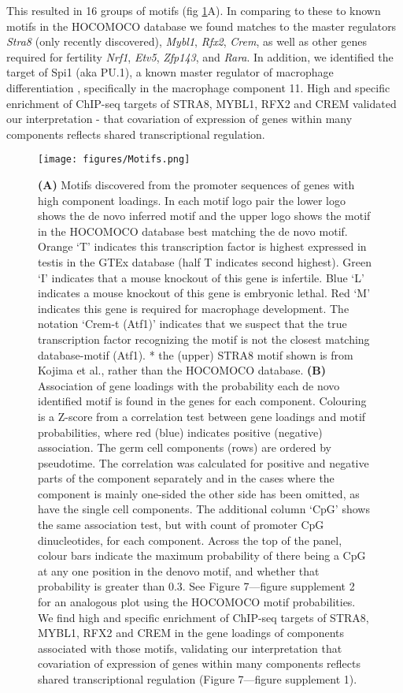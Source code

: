 This resulted in 16 groups of motifs (fig \ref{fig:Motifs}A). In comparing to these to known motifs in the HOCOMOCO database we found matches to the master regulators \textit{Stra8} (only recently discovered), \textit{Mybl1}, \textit{Rfx2}, \textit{Crem}, as well as other genes required for fertility \textit{Nrf1}, \textit{Etv5}, \textit{Zfp143}, and \textit{Rara}. In addition, we identified the target of Spi1 (aka PU.1), a known master regulator of macrophage differentiation \parencite{Rosa2007interplay}, specifically in the macrophage component 11. High and specific enrichment of ChIP-seq targets of STRA8, MYBL1, RFX2 and CREM validated our interpretation - that covariation of expression of genes within many components reflects shared transcriptional regulation.

\begin{figure}[H]
	\centering
	\texttt{[image: figures/Motifs.png]}
	\caption{
		\textbf{(A)} Motifs discovered from the promoter sequences of genes with high component loadings. In each motif logo pair the lower logo shows the de novo inferred motif and the upper logo shows the motif in the HOCOMOCO database best matching the de novo motif. Orange ‘T’ indicates this transcription factor is highest expressed in testis in the GTEx database (half T indicates second highest). Green ‘I’ indicates that a mouse knockout of this gene is infertile. Blue ‘L’ indicates a mouse knockout of this gene is embryonic lethal. Red ‘M’ indicates this gene is required for macrophage development. The notation ‘Crem-t (Atf1)’ indicates that we suspect that the true transcription factor recognizing the motif is not the closest matching database-motif (Atf1). * the (upper) STRA8 motif shown is from Kojima et al., rather than the HOCOMOCO database.
		\textbf{(B)} Association of gene loadings with the probability each de novo identified motif is found in the genes for each component. Colouring is a Z-score from a correlation test between gene loadings and motif probabilities, where red (blue) indicates positive (negative) association. The germ cell components (rows) are ordered by pseudotime. The correlation was calculated for positive and negative parts of the component separately and in the cases where the component is mainly one-sided the other side has been omitted, as have the single cell components. The additional column ‘CpG’ shows the same association test, but with count of promoter CpG dinucleotides, for each component. Across the top of the panel, colour bars indicate the maximum probability of there being a CpG at any one position in the denovo motif, and whether that probability is greater than 0.3. See Figure 7—figure supplement 2 for an analogous plot using the HOCOMOCO motif probabilities. We find high and specific enrichment of ChIP-seq targets of STRA8, MYBL1, RFX2 and CREM in the gene loadings of components associated with those motifs, validating our interpretation that covariation of expression of genes within many components reflects shared transcriptional regulation (Figure 7—figure supplement 1).
	}
	\label{fig:Motifs}
\end{figure}

